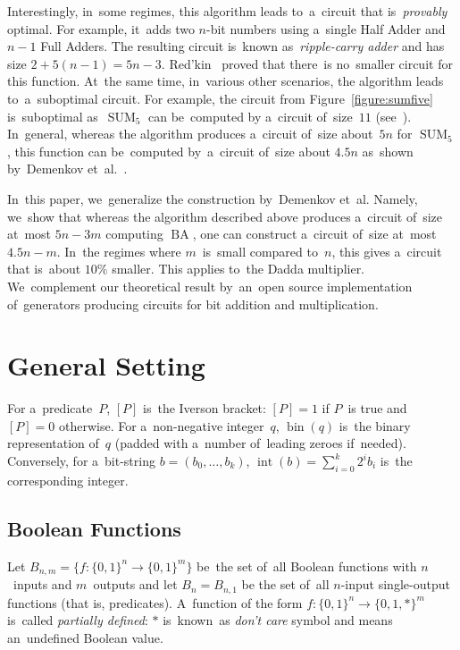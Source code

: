 \documentclass[sigconf, review, anonymous]{acmart}
\DeclareMathOperator{\SUM}{SUM}
\DeclareMathOperator{\BA}{BA}
\begin{document}
Interestingly, in~some regimes, this algorithm leads to~a~circuit 
that is~\emph{provably} optimal. For example, it~adds two $n$-bit 
numbers using a~single Half Adder and $n-1$ Full Adders. The resulting
circuit is~known as~\emph{ripple-carry adder} and has size $2+5(n-1)=5n-3$. Red'kin~\cite{Red81} proved
that there~is no~smaller circuit for this function.
At~the same time, in~various other scenarios, the algorithm leads 
to~a~suboptimal circuit. For example, the circuit from Figure~\ref{figure:sumfive} is~suboptimal as~$\SUM_5$
can be~computed by a~circuit of~size~$11$ (see~\cite{DBLP:conf/mfcs/KulikovPS22}).
In~general, whereas the algorithm produces a~circuit of~size about~$5n$
for $\SUM_5$, this function can be~computed by~a~circuit of~size about $4.5n$
as~shown by~Demenkov et~al.~\cite{DBLP:journals/ipl/DemenkovKKY10}.

In~this paper, we~generalize the construction by~Demenkov et~al.
Namely, we~show that whereas the algorithm described above produces
a~circuit of~size at~most $5n-3m$ computing $\BA$, one can construct
a~circuit of~size at~most $4.5n-m$. In~the regimes where $m$~is~small
compared to~$n$, this gives a~circuit that is~about $10\%$ smaller.
This applies to~the Dadda multiplier.
We~complement our theoretical result by~an~open source implementation
of~generators producing circuits for bit addition and multiplication.

\section{General Setting}
For a~predicate~$P$, $[P]$ is~the Iverson bracket: $[P]=1$ if $P$~is true and $[P]=0$ otherwise. For a~non-negative integer~$q$,
$\operatorname{bin}(q)$ is~the binary representation of~$q$
(padded with a~number of~leading zeroes if~needed).
Conversely, for a~bit-string $b=(b_0,\dotsc, b_k)$, $\operatorname{int}(b)=\sum_{i=0}^{k}2^ib_i$ is~the corresponding integer.

\subsection{Boolean Functions}
Let $B_{n,m}=\{f \colon \{0,1\}^n \to \{0,1\}^m\}$ be~the set of~all Boolean functions with $n$~inputs and $m$~outputs
and let $B_n=B_{n,1}$ be the set of~all $n$-input single-output functions
(that is, predicates).
A~function of the form $f \colon \{0,1\}^n \to \{0,1,*\}^m$
is~called \emph{partially defined}: $*$ is~known~as \emph{don't care} symbol
and means an~undefined Boolean value.
\end{document}
